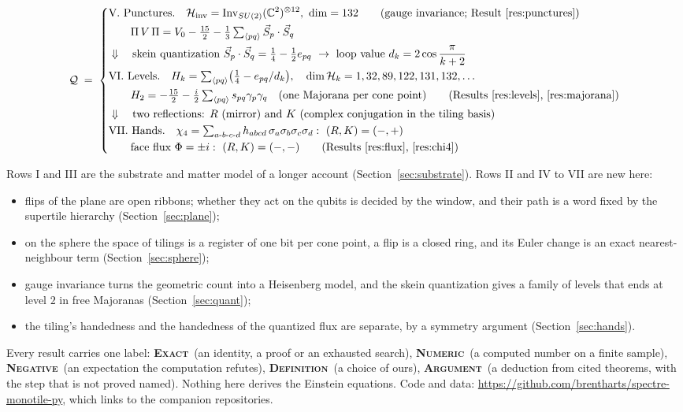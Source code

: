 \documentclass[11pt]{article}
\newcommand{\exact}{\textbf{\textsc{Exact}}}
\newcommand{\numeric}{\textbf{\textsc{Numeric}}}
\newcommand{\negres}{\textbf{\textsc{Negative}}}
\newcommand{\defn}{\textbf{\textsc{Definition}}}
\newcommand{\argu}{\textbf{\textsc{Argument}}}
\theoremstyle{definition}
\begin{document}
{\footnotesize
\begin{equation}\label{eq:overview2}
\mathcal{Q}
\;=\; \left\{ \begin{aligned}
&\text{V. Punctures.}\quad \mathcal{H}_{\mathrm{inv}}=\mathrm{Inv}_{SU(2)}(\mathbb{C}^2)^{\otimes12},\ \dim=132 \qquad \text{(gauge invariance; Result~\ref{res:punctures})}\\
&\qquad \Pi\,V\,\Pi=V_0-\tfrac{15}2-\tfrac13\textstyle\sum_{\langle pq\rangle}\vec S_p\cdot\vec S_q \\
&\Downarrow\quad \text{skein quantization } \vec S_p\cdot\vec S_q=\tfrac14-\tfrac12e_{pq}\ \to\ \text{loop value } d_k=2\cos\frac{\pi}{k+2} \\
&\text{VI. Levels.}\quad H_k=\textstyle\sum_{\langle pq\rangle}\bigl(\tfrac14-e_{pq}/d_k\bigr),\quad \dim\mathcal{H}_k=1,32,89,122,131,132,\dots \\
&\qquad H_2=-\tfrac{15}2-\tfrac{i}2\textstyle\sum_{\langle pq\rangle}s_{pq}\gamma_p\gamma_q\quad \text{(one Majorana per cone point)} \qquad \text{(Results~\ref{res:levels}, \ref{res:majorana})}\\
&\Downarrow\quad \text{two reflections: } R \text{ (mirror) and } K \text{ (complex conjugation in the tiling basis)} \\
&\text{VII. Hands.}\quad \chi_4=\textstyle\sum_{a\text{-}b\text{-}c\text{-}d}h_{abcd}\,\sigma_a\sigma_b\sigma_c\sigma_d:\ (R,K)=(-,+) \\
&\qquad \text{face flux } \Phi=\pm i:\ (R,K)=(-,-)\qquad \text{(Results~\ref{res:flux}, \ref{res:chi4})}
\end{aligned} \right.
\end{equation}
}

Rows I and III are the substrate and matter model of a longer account (Section~\ref{sec:substrate}). Rows II and IV to VII are new here:
\begin{itemize}[leftmargin=1.4em,itemsep=1pt]
\item flips of the plane are open ribbons; whether they act on the qubits is decided by the window, and their path is a word fixed by the supertile hierarchy (Section~\ref{sec:plane});
\item on the sphere the space of tilings is a register of one bit per cone point, a flip is a closed ring, and its Euler change is an exact nearest-neighbour term (Section~\ref{sec:sphere});
\item gauge invariance turns the geometric count into a Heisenberg model, and the skein quantization gives a family of levels that ends at level $2$ in free Majoranas (Section~\ref{sec:quant});
\item the tiling's handedness and the handedness of the quantized flux are separate, by a symmetry argument (Section~\ref{sec:hands}).
\end{itemize}
Every result carries one label: \exact\ (an identity, a proof or an exhausted search), \numeric\ (a computed number on a finite sample), \negres\ (an expectation the computation refutes), \defn\ (a choice of ours), \argu\ (a deduction from cited theorems, with the step that is not proved named). Nothing here derives the Einstein equations. Code and data: \url{https://github.com/brentharts/spectre-monotile-py}, which links to the companion repositories.
\end{document}
